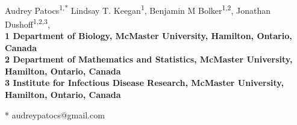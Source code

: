 \documentclass[10pt,letterpaper]{article}
\date{}
\begin{document}
\vspace*{0.35in}

\begin{flushleft}
{\Large
\textbf{}
}
\newline
\\
Audrey Patocs\textsuperscript{1,*}%
Lindsay T. Keegan\textsuperscript{1},
Benjamin M Bolker\textsuperscript{1,2},
Jonathan Dushoff\textsuperscript{1,2,3},
\\
\bigskip
\bf{1} Department of Biology, McMaster University, Hamilton, Ontario, Canada
\\
\bf{2} Department of Mathematics and Statistics, McMaster University, Hamilton, Ontario, Canada
\\
\bf{3} Institute for Infectious Disease Research, McMaster University, Hamilton, Ontario, Canada
\\
\bigskip

% 
%





* audreypatocs@gmail.com

\end{flushleft}
\end{document}
